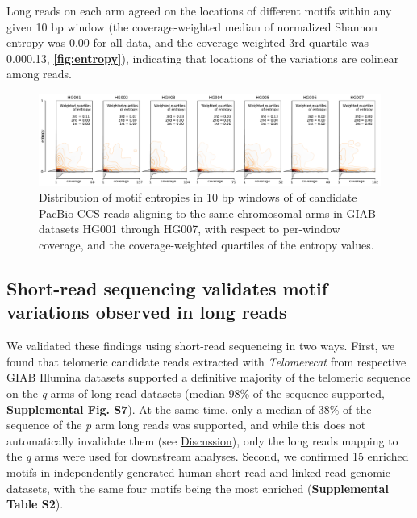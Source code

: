 \documentclass{article}
\begin{document}
    \noindent %
    Long reads on each arm agreed on the locations of different motifs within any given 10 bp window
        (the coverage-weighted median of normalized Shannon entropy was 0.00 for all data,
        and the coverage-weighted 3rd quartile was 0.00\textendash{}0.13,
        \textbf{\autoref{fig:entropy}}),
        indicating that locations of the variations are colinear among reads.
        \begin{figure}[h!] \centering
        \includegraphics[height=.75\textheight,width=\textwidth,keepaspectratio]{renders/figures/Figure-3.pdf}
        \caption{
            \small Distribution of motif entropies in 10 bp windows of of candidate PacBio CCS reads aligning to the same chromosomal arms
            in GIAB datasets HG001 through HG007,
            with respect to per-window coverage,
            and the coverage-weighted quartiles of the entropy values.
        }
        \label{fig:entropy}
        \end{figure}

\subsection*{Short-read sequencing validates motif variations observed in long reads}
    We validated these findings using short-read sequencing in two ways.
    First, we found that telomeric candidate reads extracted with \textit{Telomerecat} \cite{telomerecat}
        from respective GIAB Illumina datasets
        supported a definitive majority of the telomeric sequence on the \textit{q} arms of long-read datasets
            (median 98\% of the sequence supported, \textbf{Supplemental Fig. S7}).
        At the same time, only a median of 38\% of the sequence of the \textit{p} arm long reads was supported,
            and while this does not automatically invalidate them (see \hyperref[sec:discussion]{Discussion}),
            only the long reads mapping to the \textit{q} arms were used for downstream analyses.
    Second, we confirmed 15 enriched motifs in independently generated human short-read and linked-read genomic datasets,
        with the same four motifs being the most enriched (\textbf{Supplemental Table S2}).
\end{document}
